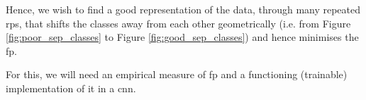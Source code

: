 
Hence, we wish to find a good representation of the data, through many repeated  \gls{rp}s, that shifts the classes away from each other geometrically (i.e. from Figure \ref{fig:poor_sep_classes} to Figure \ref{fig:good_sep_classes}) and hence minimises the \gls{fp}. 
\bigskip

For this, we will need an empirical measure of \gls{fp} and a functioning (trainable) implementation of it in a \gls{cnn}. 
\bigskip